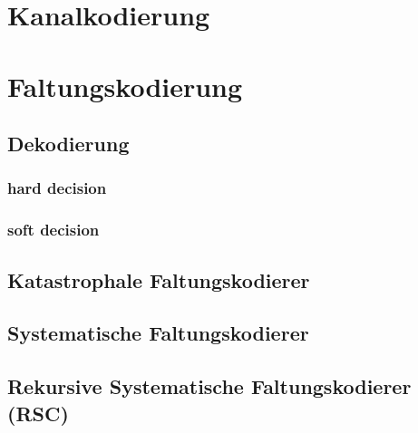 \section{Kanalkodierung}
\label{kapitel:grundlagen_kanalkodierung}

\section{Faltungskodierung}
\label{kapitel:grundlagen_faltungskodierung}

\subsection{Dekodierung}
\label{kapitel:grundlagen_dekodierung}

\subsubsection{hard decision}
\label{kapitel:grundlagen_hard_decision}
\subsubsection{soft decision}
\label{kapitel:grundlagen_soft_decision}

\subsection{Katastrophale Faltungskodierer}
\label{kapitel:grundlagen_katastrophale_kodierer}

\subsection{Systematische Faltungskodierer}
\label{kapitel:grundlagen_systematische_kodierer}

\subsection{Rekursive Systematische Faltungskodierer (RSC)}
\label{kapitel:grundlagen_rsc}